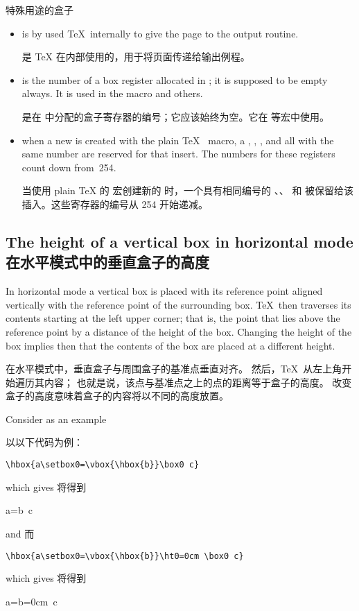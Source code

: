 特殊用途的盒子
\begin{itemize}
\item {} is by used \TeX\ internally 
 to give the page to the output routine.

 是 \TeX{} 在内部使用的，用于将页面传递给输出例程。
\item {} is the number of 
 a box register allocated in 
 ; it is supposed to be empty always.
 It is used in the macro  and others.

  是在  中分配的盒子寄存器的编号；它应该始终为空。它在  等宏中使用。 
\item when a new  is created with the plain \TeX\
  macro, a ,
 , , and  all with the same number
 are reserved for that insert.
 The numbers for these registers count down from~254.

 当使用 plain \TeX{} 的  宏创建新的  时，一个具有相同编号的 、、 和  被保留给该插入。这些寄存器的编号从 254 开始递减。
\end{itemize}


\subsection{The height of a vertical box in horizontal mode\\在水平模式中的垂直盒子的高度}

In horizontal mode a vertical box is placed with its
reference point aligned vertically with the reference
point of the surrounding box. 
\TeX\ then traverses its contents starting at the left
upper corner; that is, the point that lies above the reference
point by a distance of the height of the box.
Changing the height of the box  implies then that the
contents of the box are placed at a different height.

在水平模式中，垂直盒子与周围盒子的基准点垂直对齐。
然后，\TeX\ 从左上角开始遍历其内容；
也就是说，该点与基准点之上的点的距离等于盒子的高度。
改变盒子的高度意味着盒子的内容将以不同的高度放置。

Consider as an example

以以下代码为例：
\begin{verbatim}
\hbox{a\setbox0=\vbox{\hbox{b}}\box0 c}
\end{verbatim}
which gives 将得到
\begin{disp}\leavevmode\hbox{a=\vbox{\hbox{b}} c}\end{disp}
and  而
\begin{verbatim}
\hbox{a\setbox0=\vbox{\hbox{b}}\ht0=0cm \box0 c}
\end{verbatim}
\awp
which gives 将得到
\begin{disp}\leavevmode\hbox{a=\vbox{\hbox{b}}=0cm  c}\end{disp}

